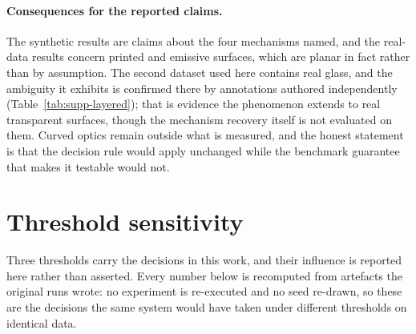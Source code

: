 \paragraph{Consequences for the reported claims.}
The synthetic results are claims about the four mechanisms named, and the real-data
results concern printed and emissive surfaces, which are planar in fact rather than
by assumption. The second dataset used here contains real glass, and the ambiguity
it exhibits is confirmed there by annotations authored independently
(Table~\ref{tab:supp-layered}); that is evidence the phenomenon extends to
real transparent surfaces, though the mechanism recovery itself is not evaluated on
them. Curved optics remain outside what is measured, and the honest statement is
that the decision rule would apply unchanged while the benchmark guarantee that
makes it testable would not.

\section{Threshold sensitivity}
\label{sec:supp-sensitivity}

Three thresholds carry the decisions in this work, and their influence is reported
here rather than asserted. Every number below is recomputed from artefacts the
original runs wrote: no experiment is re-executed and no seed re-drawn, so these
are the decisions the same system would have taken under different thresholds on
identical data.

